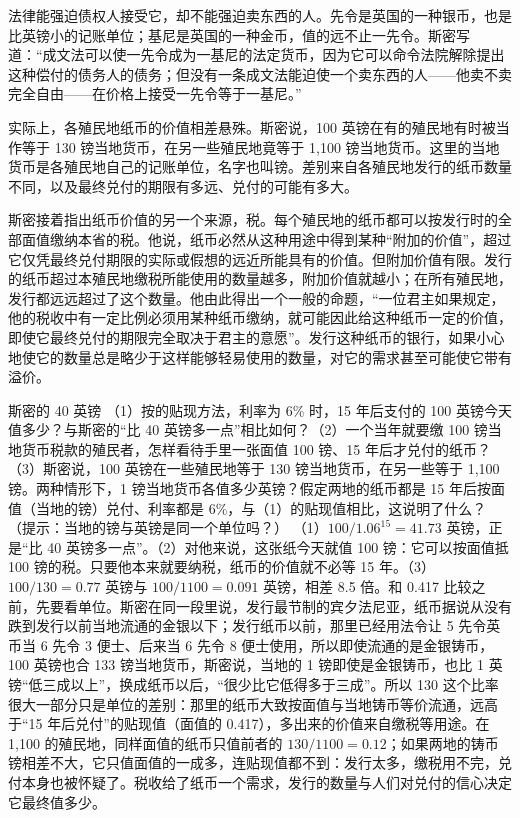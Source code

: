 法律能强迫债权人接受它，却不能强迫卖东西的人。先令是英国的一种银币，也是比英镑小的记账单位；基尼是英国的一种金币，值的远不止一先令。斯密写道：“成文法可以使一先令成为一基尼的法定货币，因为它可以命令法院解除提出这种偿付的债务人的债务；但没有一条成文法能迫使一个卖东西的人——他卖不卖完全自由——在价格上接受一先令等于一基尼。”\cite{smith1776}

实际上，各殖民地纸币的价值相差悬殊。斯密说，100 英镑在有的殖民地有时被当作等于 130 镑当地货币，在另一些殖民地竟等于 1,100 镑当地货币。这里的当地货币是各殖民地自己的记账单位，名字也叫镑。差别来自各殖民地发行的纸币数量不同，以及最终兑付的期限有多远、兑付的可能有多大\cite{smith1776}。

斯密接着指出纸币价值的另一个来源，税。每个殖民地的纸币都可以按发行时的全部面值缴纳本省的税。他说，纸币必然从这种用途中得到某种“附加的价值”，超过它仅凭最终兑付期限的实际或假想的远近所能具有的价值。但附加价值有限。发行的纸币超过本殖民地缴税所能使用的数量越多，附加价值就越小；在所有殖民地，发行都远远超过了这个数量\cite{smith1776}。他由此得出一个一般的命题，“一位君主如果规定，他的税收中有一定比例必须用某种纸币缴纳，就可能因此给这种纸币一定的价值，即使它最终兑付的期限完全取决于君主的意愿”。发行这种纸币的银行，如果小心地使它的数量总是略少于这样能够轻易使用的数量，对它的需求甚至可能使它带有溢价\cite{smith1776}。

\begin{example}{斯密的 40 英镑}\label{ex:money-smith}
（1）按的贴现方法，利率为 6\% 时，15 年后支付的 100 英镑今天值多少？与斯密的“比 40 英镑多一点”相比如何？（2）一个当年就要缴 100 镑当地货币税款的殖民者，怎样看待手里一张面值 100 镑、15 年后才兑付的纸币？（3）斯密说，100 英镑在一些殖民地等于 130 镑当地货币，在另一些等于 1,100 镑。两种情形下，1 镑当地货币各值多少英镑？假定两地的纸币都是 15 年后按面值（当地的镑）兑付、利率都是 6\%，与（1）的贴现值相比，这说明了什么？（提示：当地的镑与英镑是同一个单位吗？）
\solution （1）$100/1.06^{15}=41.73$ 英镑，正是“比 40 英镑多一点”。（2）对他来说，这张纸今天就值 100 镑：它可以按面值抵 100 镑的税。只要他本来就要纳税，纸币的价值就不必等 15 年。（3）$100/130=0.77$ 英镑与 $100/1100=0.091$ 英镑，相差 8.5 倍。和 0.417 比较之前，先要看单位。斯密在同一段里说，发行最节制的宾夕法尼亚，纸币据说从没有跌到发行以前当地流通的金银以下；发行纸币以前，那里已经用法令让 5 先令英币当 6 先令 3 便士、后来当 6 先令 8 便士使用，所以即使流通的是金银铸币，100 英镑也合 133 镑当地货币，斯密说，当地的 1 镑即使是金银铸币，也比 1 英镑“低三成以上”，换成纸币以后，“很少比它低得多于三成”\cite{smith1776}。所以 130 这个比率很大一部分只是单位的差别：那里的纸币大致按面值与当地铸币等价流通，远高于“15 年后兑付”的贴现值（面值的 0.417），多出来的价值来自缴税等用途。在 1,100 的殖民地，同样面值的纸币只值前者的 $130/1100=0.12$；如果两地的铸币镑相差不大，它只值面值的一成多，连贴现值都不到：发行太多，缴税用不完，兑付本身也被怀疑了。税收给了纸币一个需求，发行的数量与人们对兑付的信心决定它最终值多少。
\end{example}

